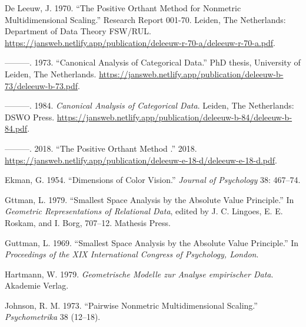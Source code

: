 \documentclass[
  12pt,
]{article}
\newlength{\cslhangindent}
\newenvironment{CSLReferences}[2] %
 {\begin{list}{}{%
  \setlength{\itemindent}{0pt}
  \setlength{\leftmargin}{0pt}
  \setlength{\parsep}{0pt}
  \ifodd #1
   \setlength{\leftmargin}{\cslhangindent}
   \setlength{\itemindent}{-1\cslhangindent}
  \fi
  \setlength{\itemsep}{#2\baselineskip}}}
 {\end{list}}
\begin{document}
\label{refs}
\begin{CSLReferences}{1}{0}
De Leeuw, J. 1970. {``The Positive Orthant Method for Nonmetric Multidimensional Scaling.''} Research Report 001-70. Leiden, The Netherlands: Department of Data Theory FSW/RUL. \url{https://jansweb.netlify.app/publication/deleeuw-r-70-a/deleeuw-r-70-a.pdf}.

---------. 1973. {``Canonical Analysis of Categorical Data.''} PhD thesis, University of Leiden, The Netherlands. \url{https://jansweb.netlify.app/publication/deleeuw-b-73/deleeuw-b-73.pdf}.

---------. 1984. \emph{Canonical Analysis of Categorical Data}. Leiden, The Netherlands: DSWO Press. \url{https://jansweb.netlify.app/publication/deleeuw-b-84/deleeuw-b-84.pdf}.

---------. 2018. {``{The Positive Orthant Method }.''} 2018. \url{https://jansweb.netlify.app/publication/deleeuw-e-18-d/deleeuw-e-18-d.pdf}.

Ekman, G. 1954. {``{Dimensions of Color Vision}.''} \emph{Journal of Psychology} 38: 467--74.

Gttman, L. 1979. {``Smallest Space Analysis by the Absolute Value Principle.''} In \emph{{Geometric Representations of Relational Data}}, edited by J. C. Lingoes, E. E. Roskam, and I. Borg, 707--12. Mathesis Press.

Guttman, L. 1969. {``{Smallest Space Analysis by the Absolute Value Principle}.''} In \emph{{Proceedings of the XIX International Congress of Psychology, London}}.

Hartmann, W. 1979. \emph{{Geometrische Modelle zur Analyse empirischer Data}}. Akademie Verlag.

Johnson, R. M. 1973. {``{Pairwise Nonmetric Multidimensional Scaling}.''} \emph{Psychometrika} 38 (12--18).

\end{CSLReferences}
\end{document}
